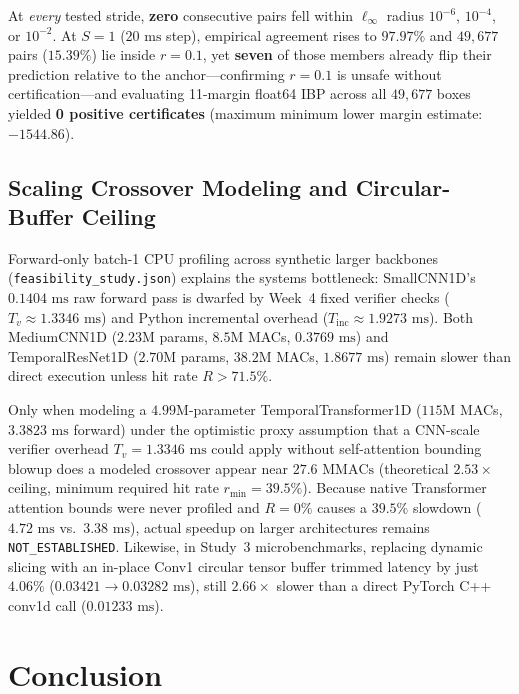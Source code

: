 \documentclass[11pt,oneside,a4paper]{report}
\newcommand{\code}[1]{{\small\upshape\ttfamily #1}}
\newcommand{\pathcode}[1]{{\small\upshape\ttfamily\nolinkurl{#1}}}
\theoremstyle{remark}
\begin{document}
At \emph{every} tested stride, \textbf{zero} consecutive pairs fell within $\ell_\infty$ radius $10^{-6}$, $10^{-4}$, or $10^{-2}$. At $S=1$ ($20\text{ ms}$ step), empirical agreement rises to $97.97\%$ and $49,677$ pairs ($15.39\%$) lie inside $r=0.1$, yet \textbf{seven} of those members already flip their prediction relative to the anchor—confirming $r=0.1$ is unsafe without certification—and evaluating 11-margin \code{float64} IBP across all $49,677$ boxes yielded \textbf{0 positive certificates} (maximum minimum lower margin estimate: $-1544.86$).

\section{Scaling Crossover Modeling and Circular-Buffer Ceiling}
Forward-only batch-1 CPU profiling across synthetic larger backbones (\pathcode{feasibility_study.json}) explains the systems bottleneck: \code{SmallCNN1D}'s $0.1404\text{ ms}$ raw forward pass is dwarfed by Week~4 fixed verifier checks ($T_v \approx 1.3346\text{ ms}$) and Python incremental overhead ($T_{\text{inc}} \approx 1.9273\text{ ms}$). Both \code{MediumCNN1D} ($2.23\text{M}$ params, $8.5\text{M}$ MACs, $0.3769\text{ ms}$) and \code{TemporalResNet1D} ($2.70\text{M}$ params, $38.2\text{M}$ MACs, $1.8677\text{ ms}$) remain slower than direct execution unless hit rate $R > 71.5\%$.

Only when modeling a $4.99\text{M}$-parameter \code{TemporalTransformer1D} ($115\text{M}$ MACs, $3.3823\text{ ms}$ forward) under the optimistic proxy assumption that a CNN-scale verifier overhead $T_v = 1.3346\text{ ms}$ could apply without self-attention bounding blowup does a modeled crossover appear near $27.6\text{ MMACs}$ (theoretical $2.53\times$ ceiling, minimum required hit rate $r_{\min} = 39.5\%$). Because native Transformer attention bounds were never profiled and $R=0\%$ causes a $39.5\%$ slowdown ($4.72\text{ ms}$ vs.\ $3.38\text{ ms}$), actual speedup on larger architectures remains \pathcode{NOT_ESTABLISHED}. Likewise, in Study~3 microbenchmarks, replacing dynamic slicing with an in-place \code{Conv1} circular tensor buffer trimmed latency by just $4.06\%$ ($0.03421 \to 0.03282\text{ ms}$), still $2.66\times$ slower than a direct PyTorch C++ \code{conv1d} call ($0.01233\text{ ms}$).

\chapter{Conclusion}
\end{document}
